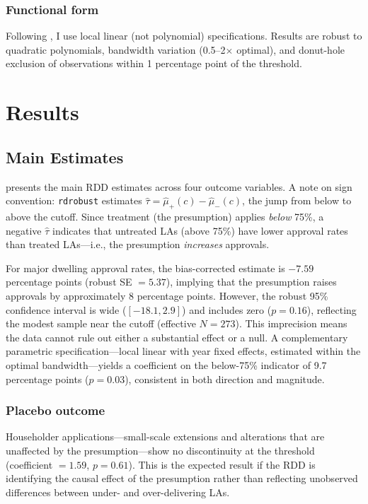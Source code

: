 \documentclass[12pt]{article}
\begin{document}
\subsubsection*{Functional form} Following \citet{gelman2019}, I use local linear (not polynomial) specifications. Results are robust to quadratic polynomials, bandwidth variation (0.5--2$\times$ optimal), and donut-hole exclusion of observations within 1 percentage point of the threshold.


\section{Results}

\subsection{Main Estimates}

 presents the main RDD estimates across four outcome variables. A note on sign convention: \texttt{rdrobust} estimates $\hat{\tau} = \hat{\mu}_+(c) - \hat{\mu}_-(c)$, the jump from below to above the cutoff. Since treatment (the presumption) applies \emph{below} 75\%, a negative $\hat{\tau}$ indicates that untreated LAs (above 75\%) have lower approval rates than treated LAs---i.e., the presumption \emph{increases} approvals.

For major dwelling approval rates, the bias-corrected estimate is $-7.59$ percentage points (robust SE $= 5.37$), implying that the presumption raises approvals by approximately 8 percentage points. However, the robust 95\% confidence interval is wide ($[-18.1, 2.9]$) and includes zero ($p = 0.16$), reflecting the modest sample near the cutoff (effective $N = 273$). This imprecision means the data cannot rule out either a substantial effect or a null. A complementary parametric specification---local linear with year fixed effects, estimated within the optimal bandwidth---yields a coefficient on the below-75\% indicator of 9.7 percentage points ($p = 0.03$), consistent in both direction and magnitude.

\subsubsection*{Placebo outcome} Householder applications---small-scale extensions and alterations that are unaffected by the presumption---show no discontinuity at the threshold (coefficient $= 1.59$, $p = 0.61$). This is the expected result if the RDD is identifying the causal effect of the presumption rather than reflecting unobserved differences between under- and over-delivering LAs.
\end{document}
